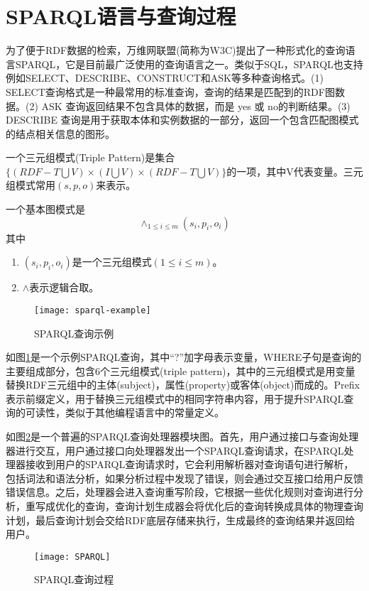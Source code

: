 \section{SPARQL语言与查询过程}
为了便于RDF数据的检索，万维网联盟(简称为W3C)提出了一种形式化的查询语言SPARQL，它是目前最广泛使用的查询语言之一。类似于SQL，SPARQL也支持例如SELECT、DESCRIBE、CONSTRUCT和ASK等多种查询格式。(1) SELECT查询格式是一种最常用的标准查询，查询的结果是匹配到的RDF图数据。(2) ASK 查询返回结果不包含具体的数据，而是 yes 或 no的判断结果。(3) DESCRIBE 查询是用于获取本体和实例数据的一部分，返回一个包含匹配图模式的结点相关信息的图形。
\begin{definition}[（三元组模式）] 
    \label{Triple}   
    一个三元组模式(Triple Pattern)是集合$\lbrace (RDF-T \bigcup V)\times(I \bigcup V)\times(RDF-T \bigcup V)\rbrace$的一项，其中V代表变量。三元组模式常用$(s,p,o)$来表示。
\end{definition}
\begin{definition}    
    \label{BGP}
    一个基本图模式是$$\wedge_{1\leqslant i\leqslant m}(s_i,p_i,o_i)$$
    其中
    \begin{enumerate}
        \item $(s_i,p_i,o_i)$是一个三元组模式$(1 \leqslant  i \leqslant m)$。
        \item $\wedge$表示逻辑合取。
    \end{enumerate}
    
\end{definition}

\begin{figure}[h]
    \centering
    \texttt{[image: sparql-example]}
    \caption{SPARQL查询示例}
    \label{sparql-example}
\end{figure}

如图\ref{sparql-example}是一个示例SPARQL查询，其中“?”加字母表示变量，WHERE子句是查询的主要组成部分，包含6个三元组模式(triple pattern)，其中的三元组模式是用变量替换RDF三元组中的主体(subject)，属性(property)或客体(object)而成的。Prefix表示前缀定义，用于替换三元组模式中的相同字符串内容，用于提升SPARQL查询的可读性，类似于其他编程语言中的常量定义。

如图\ref{SPARQL查询过程}是一个普遍的SPARQL查询处理器模块图。首先，用户通过接口与查询处理器进行交互，用户通过接口向处理器发出一个SPARQL查询请求，在SPARQL处理器接收到用户的SPARQL查询请求时，它会利用解析器对查询语句进行解析，包括词法和语法分析，如果分析过程中发现了错误，则会通过交互接口给用户反馈错误信息。之后，处理器会进入查询重写阶段，它根据一些优化规则对查询进行分析，重写成优化的查询，查询计划生成器会将优化后的查询转换成具体的物理查询计划，最后查询计划会交给RDF底层存储来执行，生成最终的查询结果并返回给用户。
\begin{figure}[h]
\centering
\texttt{[image: SPARQL]}
\caption{SPARQL查询过程}
\label{SPARQL查询过程}
\end{figure}

